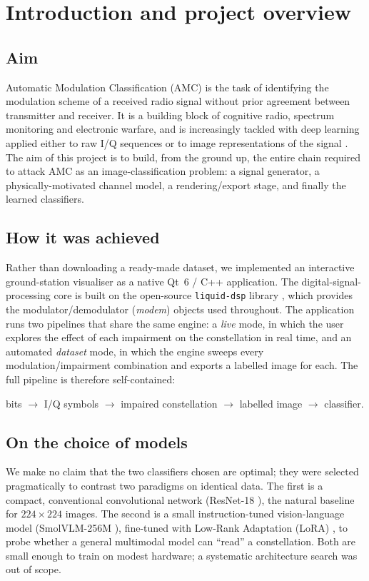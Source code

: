 \documentclass[11pt,a4paper,onecolumn,final]{article}
\begin{document}
\newpage



\section{Introduction and project overview}

\subsection{Aim}
Automatic Modulation Classification (AMC) is the task of identifying the modulation scheme
of a received radio signal without prior agreement between transmitter and receiver. It is a
building block of cognitive radio, spectrum monitoring and electronic warfare, and is
increasingly tackled with deep learning applied either to raw I/Q sequences or to image
representations of the signal \cite{OShea2018}. The aim of this project is to build, from
the ground up, the entire chain required to attack AMC as an image-classification problem:
a signal generator, a physically-motivated channel model, a rendering/export stage, and
finally the learned classifiers.

\subsection{How it was achieved}
Rather than downloading a ready-made dataset, we implemented an interactive ground-station
visualiser as a native Qt~6 / C++ application. The digital-signal-processing core is built
on the open-source \texttt{liquid-dsp} library \cite{liquiddsp}, which provides the
modulator/demodulator (\emph{modem}) objects used throughout. The application runs two
pipelines that share the same engine: a \emph{live} mode, in which the user explores the
effect of each impairment on the constellation in real time, and an automated \emph{dataset}
mode, in which the engine sweeps every modulation/impairment combination and exports a
labelled image for each. The full pipeline is therefore self-contained:
\begin{center}
bits $\rightarrow$ I/Q symbols $\rightarrow$ impaired constellation $\rightarrow$ labelled
image $\rightarrow$ classifier.
\end{center}

\subsection{On the choice of models}
We make no claim that the two classifiers chosen are optimal; they were selected
pragmatically to contrast two paradigms on identical data. The first is a compact,
conventional convolutional network (ResNet-18 \cite{He2016}), the natural baseline for
$224\times224$ images. The second is a small instruction-tuned vision-language model
(SmolVLM-256M \cite{SmolVLM2025}), fine-tuned with Low-Rank Adaptation (LoRA) \cite{Hu2021},
to probe whether a general multimodal model can ``read'' a constellation. Both are small
enough to train on modest hardware; a systematic architecture search was out of scope.
\end{document}
